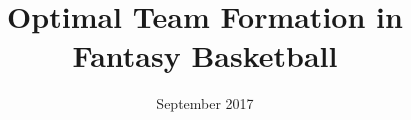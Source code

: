 \documentclass[a4paper, 11pt, oneside]{Thesis}  %
\begin{document}
\frontmatter      %

\title  {Optimal Team Formation in Fantasy Basketball}
\addresses  {\groupname\\\deptname\\\univname}  %
\date       {September 2017}
\subject    {}
\keywords   {}

\maketitle


\fancyhead{}  %
\rhead{\thepage}  %
\lhead{}  %

\pagestyle{fancy}  %
\end{document}
